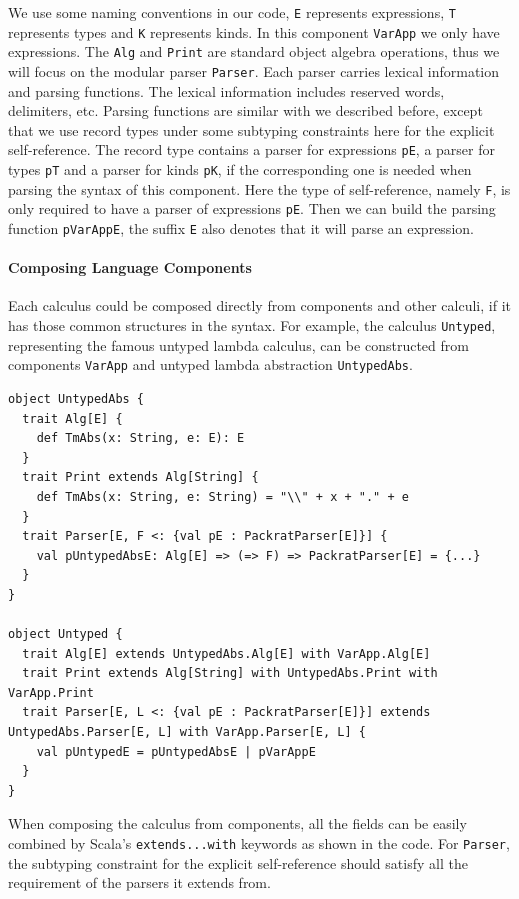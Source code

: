 We use some naming conventions in our code, \lstinline{E} represents
expressions, \lstinline{T} represents types and \lstinline{K}
represents kinds. In this component \lstinline{VarApp} we only have
expressions. The \lstinline{Alg} and \lstinline{Print} are standard
object algebra operations, thus we will focus on the modular parser
\lstinline{Parser}. Each parser carries lexical information and
parsing functions. The lexical information includes reserved words,
delimiters, etc. Parsing functions are similar with we described
before, except that we use record types under some subtyping
constraints here for the explicit self-reference. The record type
contains a parser for expressions \lstinline{pE}, a parser for types
\lstinline{pT} and a parser for kinds \lstinline{pK}, if the
corresponding one is needed when parsing the syntax of this component.
Here the type of self-reference, namely \lstinline{F}, is only
required to have a parser of expressions \lstinline{pE}. Then we can
build the parsing function \lstinline{pVarAppE}, the suffix
\lstinline{E} also denotes that it will parse an expression.

\paragraph{Composing Language Components}
Each calculus could be composed directly from components and other
calculi, if it has those common structures in the syntax. For example,
the calculus \lstinline{Untyped}, representing the famous untyped
lambda calculus, can be constructed from components \lstinline{VarApp}
and untyped lambda abstraction \lstinline{UntypedAbs}.

\begin{lstlisting}
object UntypedAbs {
  trait Alg[E] {
    def TmAbs(x: String, e: E): E
  }
  trait Print extends Alg[String] {
    def TmAbs(x: String, e: String) = "\\" + x + "." + e
  }
  trait Parser[E, F <: {val pE : PackratParser[E]}] {
    val pUntypedAbsE: Alg[E] => (=> F) => PackratParser[E] = {...}
  }
}

object Untyped {
  trait Alg[E] extends UntypedAbs.Alg[E] with VarApp.Alg[E]
  trait Print extends Alg[String] with UntypedAbs.Print with VarApp.Print
  trait Parser[E, L <: {val pE : PackratParser[E]}] extends UntypedAbs.Parser[E, L] with VarApp.Parser[E, L] {
    val pUntypedE = pUntypedAbsE | pVarAppE
  }
}
\end{lstlisting}

When composing the calculus from components, all the fields can be
easily combined by Scala’s \lstinline{extends...with} keywords as
shown in the code. For \lstinline{Parser}, the subtyping constraint
for the explicit self-reference should satisfy all the requirement of
the parsers it extends from. 


